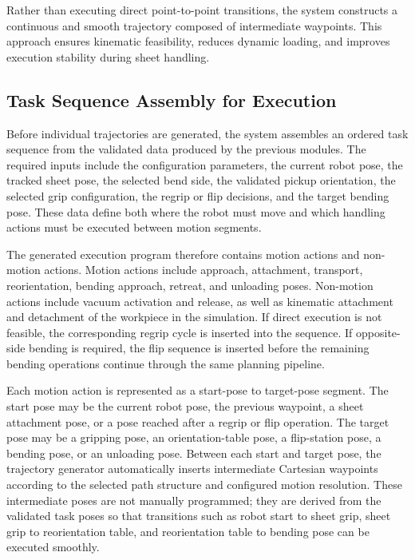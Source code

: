 Rather than executing direct point-to-point transitions, the system constructs a continuous and smooth trajectory composed of intermediate waypoints. This approach ensures kinematic feasibility, reduces dynamic loading, and improves execution stability during sheet handling.

\subsection{Task Sequence Assembly for Execution}
\label{sec:task-sequence-assembly-execution}

Before individual trajectories are generated, the system assembles an ordered task sequence from the validated data produced by the previous modules. The required inputs include the configuration parameters, the current robot pose, the tracked sheet pose, the selected bend side, the validated pickup orientation, the selected grip configuration, the regrip or flip decisions, and the target bending pose. These data define both where the robot must move and which handling actions must be executed between motion segments.

The generated execution program therefore contains motion actions and non-motion actions. Motion actions include approach, attachment, transport, reorientation, bending approach, retreat, and unloading poses. Non-motion actions include vacuum activation and release, as well as kinematic attachment and detachment of the workpiece in the simulation. If direct execution is not feasible, the corresponding regrip cycle is inserted into the sequence. If opposite-side bending is required, the flip sequence is inserted before the remaining bending operations continue through the same planning pipeline.

Each motion action is represented as a start-pose to target-pose segment. The start pose may be the current robot pose, the previous waypoint, a sheet attachment pose, or a pose reached after a regrip or flip operation. The target pose may be a gripping pose, an orientation-table pose, a flip-station pose, a bending pose, or an unloading pose. Between each start and target pose, the trajectory generator automatically inserts intermediate Cartesian waypoints according to the selected path structure and configured motion resolution. These intermediate poses are not manually programmed; they are derived from the validated task poses so that transitions such as robot start to sheet grip, sheet grip to reorientation table, and reorientation table to bending pose can be executed smoothly.

